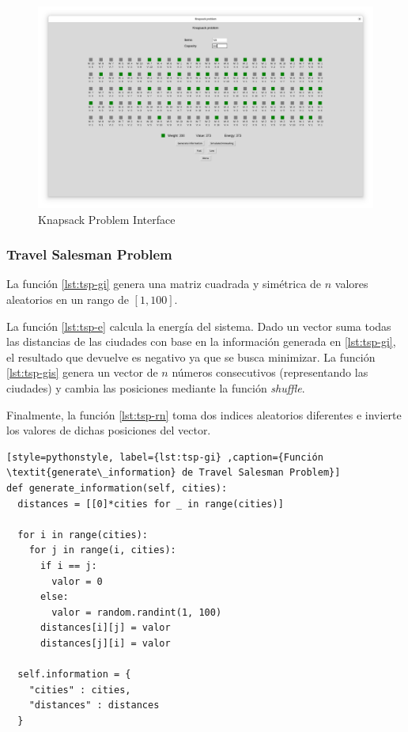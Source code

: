 \documentclass[12pt,twoside]{article}
\begin{document}
	\begin{figure}[h!]
		\centering
		\includegraphics[width=\linewidth]{img/kp}
		\caption{Knapsack Problem Interface}
		\label{fig:kp}
	\end{figure}
	
	
	\subsubsection{Travel Salesman Problem}

La función \ref{lst:tsp-gi} genera una matriz cuadrada y simétrica de $n$ valores aleatorios en un rango de $[1, 100]$.

La función \ref{lst:tsp-e} calcula la energía del sistema. Dado un vector suma todas las distancias de las ciudades con base en la información generada en \ref{lst:tsp-gi}, el resultado que devuelve es negativo ya que se busca minimizar. La función \ref{lst:tsp-gis} genera un vector de $n$ números consecutivos (representando las ciudades) y cambia las posiciones mediante la función \textit{shuffle}.

Finalmente, la función \ref{lst:tsp-rn} toma dos indices aleatorios diferentes e invierte los valores de dichas posiciones del vector.

\begin{lstlisting}[style=pythonstyle, label={lst:tsp-gi} ,caption={Función \textit{generate\_information} de Travel Salesman Problem}]
def generate_information(self, cities):
  distances = [[0]*cities for _ in range(cities)]

  for i in range(cities):
	for j in range(i, cities):  
	  if i == j:
	    valor = 0  
	  else:
		valor = random.randint(1, 100)
	  distances[i][j] = valor
	  distances[j][i] = valor 

  self.information = {
	"cities" : cities,
	"distances" : distances
  }
\end{lstlisting}
\end{document}
